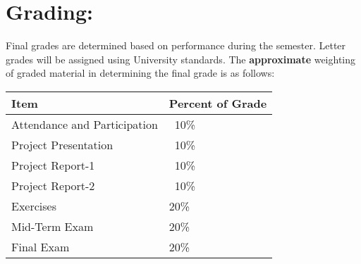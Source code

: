 \documentclass[12pt]{article}
\begin{document}
\section*{Grading:} Final grades are determined based on performance during the semester.  Letter grades will be assigned using University standards.  The \textbf{approximate} weighting of graded material in determining the final grade is as follows:
\begin{center}
\begin{table}[h!]
   \begin{tabular}{l l}
Item & Percent of Grade \\
\hline
\hline
Attendance and Participation & ~10\% \\
Project Presentation & ~10\% \\
Project Report-1 & ~10\% \\
Project Report-2 & ~10\% \\
Exercises & 20\% \\
Mid-Term Exam & 20\% \\
Final Exam & 20\% \\
\hline
\end{tabular}
\end{table}
\end{center}
\clearpage
\end{document}
